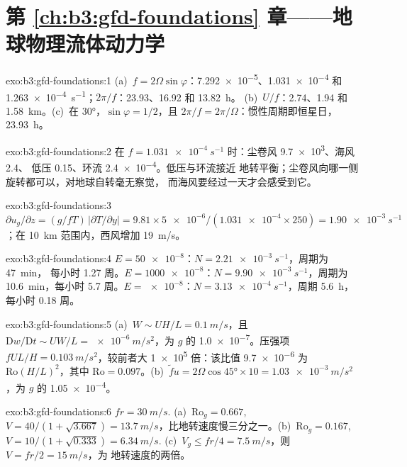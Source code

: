 \section*{第 \ref{ch:b3:gfd-foundations} 章——地球物理流体动力学}

\begin{solution}{exo:b3:gfd-foundations:1}
(a)~$f = 2\Omega\sin\varphi$：\num{7.292e-5}、\num{1.031e-4} 和
\qty{1.263e-4}{s^{-1}}；$2\pi/f$：23.93、16.92 和 \qty{13.82}{h}。
(b)~$U/f$：2.74、1.94 和 \qty{1.58}{km}。(c)~在 \ang{30}，$\sin\varphi =
1/2$，且 $2\pi/f = 2\pi/\Omega$：惯性周期即恒星日，
\qty{23.93}{h}。
\end{solution}

\begin{solution}{exo:b3:gfd-foundations:2}
在 $f = \qty{1.031e-4}{s^{-1}}$ 时：尘卷风 \num{9.7e3}、海风 2.4、
低压 0.15、环流 \num{2.4e-4}。低压与环流接近
地转平衡；尘卷风向哪一侧旋转都可以，对地球自转毫无察觉，
而海风要经过一天才会感受到它。
\end{solution}

\begin{solution}{exo:b3:gfd-foundations:3}
$\partial u_g/\partial z = (g/fT)\,|\partial T/\partial y| = 9.81\times
\num{5e-6}/(\num{1.031e-4}\times250) = \qty{1.90e-3}{s^{-1}}$；在
\qty{10}{km} 范围内，西风增加 \qty{19}{m/s}。
\end{solution}

\begin{solution}{exo:b3:gfd-foundations:4}
$E = \num{50e-8}$：$N = \qty{2.21e-3}{s^{-1}}$，周期为 \qty{47}{min}，
每小时 \num{1.27} 周。$E = \num{1000e-8}$：$N = \qty{9.90e-3}{s^{-1}}$，周期为
\qty{10.6}{min}，每小时 5.7 周。$E = \num{e-8}$：$N =
\qty{3.13e-4}{s^{-1}}$，周期 \qty{5.6}{h}，每小时 0.18 周。
\end{solution}

\begin{solution}{exo:b3:gfd-foundations:5}
(a)~$W \sim UH/L = \qty{0.1}{m/s}$，且 $\mathrm Dw/\mathrm Dt \sim UW/L =
\qty{e-6}{m/s^2}$，为 $g$ 的 \num{1.0e-7}。压强项 $fUL/H =
\qty{0.103}{m/s^2}$，较前者大 \num{1e5} 倍：该比值 \num{9.7e-6} 为
$\mathrm{Ro}(H/L)^2$，其中 $\mathrm{Ro} = 0.097$。(b)~$\tilde fu =
2\Omega\cos\ang{45}\times10 = \qty{1.03e-3}{m/s^2}$，为 $g$ 的 \num{1.05e-4}。
\end{solution}

\begin{solution}{exo:b3:gfd-foundations:6}
$fr = \qty{30}{m/s}$. (a)~$\mathrm{Ro}_g = 0.667$, $V = 40/(1 + \sqrt{3.667})
= \qty{13.7}{m/s}$，比地转速度慢三分之一。(b)~$\mathrm{Ro}_g =
0.167$, $V = 10/(1 + \sqrt{0.333}) = \qty{6.34}{m/s}$. (c)~$V_g \le fr/4 =
\qty{7.5}{m/s}$，则 $V = fr/2 = \qty{15}{m/s}$，为
地转速度的两倍。
\end{solution}

